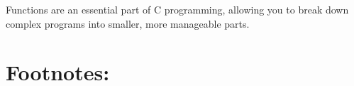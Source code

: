 \documentclass[a4paper]{article}
\begin{document}
Functions are an essential part of C programming, allowing you to break down
complex programs into smaller, more manageable parts.






























\clearpage
\section{Footnotes:}
\label{sec:org4d521f3}
\end{document}
